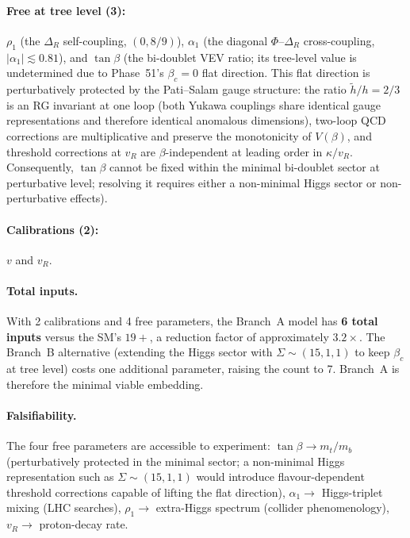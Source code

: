 \documentclass[11pt,a4paper]{article}
\theoremstyle{plain}
\theoremstyle{definition}
\theoremstyle{remark}
\begin{document}
\paragraph{Free at tree level (3):}
$\rho_1$ (the $\Delta_R$ self-coupling, $(0, 8/9)$),
$\alpha_1$ (the diagonal $\Phi$--$\Delta_R$ cross-coupling,
$|\alpha_1| \lesssim 0.81$),
and $\tan\beta$ (the bi-doublet VEV ratio; its tree-level value is
undetermined due to Phase~51's $\beta_c = 0$ flat direction.
This flat direction is perturbatively protected by the Pati--Salam
gauge structure: the ratio $\tilde{h}/h = 2/3$ is an RG invariant
at one loop (both Yukawa couplings share identical gauge
representations and therefore identical anomalous dimensions),
two-loop QCD corrections are multiplicative and preserve the
monotonicity of $V(\beta)$, and threshold corrections at $v_R$
are $\beta$-independent at leading order in $\kappa/v_R$.
Consequently, $\tan\beta$ cannot be fixed within the minimal
bi-doublet sector at perturbative level; resolving it requires
either a non-minimal Higgs sector or non-perturbative effects).

\paragraph{Calibrations (2):} $v$ and $v_R$.

\paragraph{Total inputs.}
With 2 calibrations and 4 free parameters,
the Branch~A model has \textbf{6 total inputs} versus the SM's
$19+$, a reduction factor of approximately $3.2\times$.
The Branch~B alternative (extending the Higgs sector with
$\Sigma \sim (15,1,1)$ to keep $\beta_c$ at tree level) costs one
additional parameter, raising the count to 7.  Branch~A is
therefore the minimal viable embedding.

\paragraph{Falsifiability.}
The four free parameters are accessible to experiment:
$\tan\beta \to m_t/m_b$ (perturbatively protected in the minimal
sector; a non-minimal Higgs representation such as $\Sigma \sim
(15,1,1)$ would introduce flavour-dependent threshold corrections
capable of lifting the flat direction),
$\alpha_1 \to$ Higgs-triplet mixing (LHC searches),
$\rho_1 \to$ extra-Higgs spectrum (collider phenomenology),
$v_R \to$ proton-decay rate.
\end{document}

